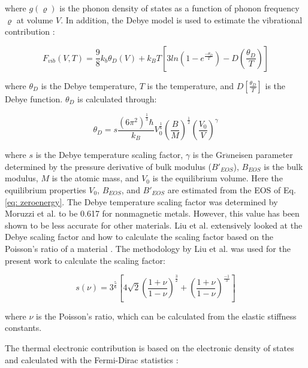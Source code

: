 \noindent where $g(\varrho)$ is the phonon density of states as a function of phonon frequency $\varrho$ at volume $V$.  In addition, the Debye model is used to estimate the vibrational contribution \cite{Shang2010}: 

\begin{equation}
\label{eq: debye}
F_{vib}(V,T) = \frac{9}{8} k_{b} \theta_{D}(V) + k_{B}T \left[ 3 ln \left( 1 - e^{\frac{-\theta_{D}}{T}} \right) - D \left( \frac{\theta_D}{T} \right) \right] 
\end{equation}

\noindent where $\theta_{D}$ is the Debye temperature, $T$ is the temperature, and $D \left[ \frac{\theta_{D}}{T} \right] $ is the Debye function. $\theta_{D}$ is calculated through: 

\begin{equation}
\label{eq: debyetemp}
\theta_{D} = s \frac{(6\pi^2)^{\frac{1}{3}}\hbar}{k_B} V_{0}^{\frac{1}{6}} \left( \frac{B}{M} \right)^{\frac{1}{2}} \left( \frac{V_0}{V} \right)^{\gamma} 
\end{equation}

\noindent where $s$ is the Debye temperature scaling factor, $\gamma$ is the Gr$\ddot{u}$neisen parameter determined by the pressure derivative of bulk modulus ($B'_{EOS}$), $B_{EOS}$ is the bulk modulus, $M$ is the atomic mass, and $V_0$ is the equilibrium volume. Here the equilibrium properties $V_0$, $B_{EOS}$, and $B'_{EOS}$ are estimated from the EOS of Eq. \ref{eq: zeroenergy}. The Debye temperature scaling factor was determined by Moruzzi et al. \cite{Moruzzi1988} to be 0.617 for nonmagnetic metals. However, this value has been shown to be less accurate for other materials. Liu et al. extensively looked at the Debye scaling factor and how to calculate the scaling factor based on the Poisson's ratio of a material \cite{Liu2015}. The methodology by Liu et al. \cite{Liu2015} was used for the present work to calculate the scaling factor: 

\begin{equation}
\label{eq: debyescaling}
s(\nu) = 3^{\frac{5}{6}} \left[ 4\sqrt{2} \left( \frac{1 + \nu}{1 - \nu} \right)^{\frac{3}{2}} + \left( \frac{1 + \nu}{1 - \nu} \right)^{\frac{-1}{3}} \right]
\end{equation}

\noindent where $\nu$ is the Poisson's ratio, which can be calculated from the elastic stiffness constants.

The thermal electronic contribution is based on the electronic density of states and calculated with the Fermi-Dirac statistics \cite{Shang2010,Wang2004}:

